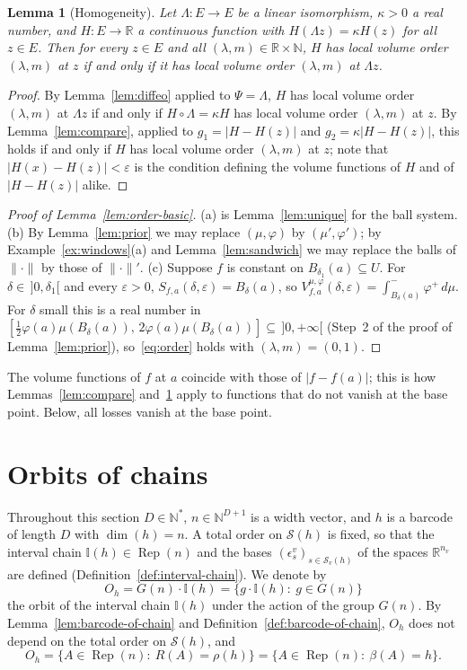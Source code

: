 \documentclass[11pt,a4paper]{article}
\newtheorem{lemma}[theorem]{Lemma}
\theoremstyle{definition}
\theoremstyle{remark}
\numberwithin{equation}{section}
\newcommand{\N}{\mathbb{N}}
\newcommand{\R}{\mathbb{R}}
\newcommand{\Rep}{\operatorname{Rep}}
\newcommand{\norm}[1]{\lVert #1\rVert}
\newcommand{\abs}[1]{\lvert #1\rvert}
\newcommand{\eps}{\varepsilon}
\newcommand{\I}{\mathbb I}
\newcommand{\Sl}{\mathcal S}
\begin{document}
\begin{lemma}[Homogeneity]\label{lem:homog-order}
Let $\Lambda:E\to E$ be a linear isomorphism, $\kappa>0$ a real number, and $H:E\to\R$ a continuous function with $H(\Lambda z)=\kappa H(z)$ for all $z\in E$. Then for every $z\in E$ and all $(\lambda,m)\in\R\times\N$, $H$ has local volume order $(\lambda,m)$ at $z$ if and only if it has local volume order $(\lambda,m)$ at $\Lambda z$.
\end{lemma}
\begin{proof}
By Lemma~\ref{lem:diffeo} applied to $\Psi=\Lambda$, $H$ has local volume order $(\lambda,m)$ at $\Lambda z$ if and only if $H\circ\Lambda=\kappa H$ has local volume order $(\lambda,m)$ at $z$. By Lemma~\ref{lem:compare}, applied to $g_1=\abs{H-H(z)}$ and $g_2=\kappa\abs{H-H(z)}$, this holds if and only if $H$ has local volume order $(\lambda,m)$ at $z$; note that $\abs{H(x)-H(z)}<\eps$ is the condition defining the volume functions of $H$ and of $\abs{H-H(z)}$ alike.
\end{proof}

\begin{proof}[Proof of Lemma~\ref{lem:order-basic}]
(a) is Lemma~\ref{lem:unique} for the ball system. (b) By Lemma~\ref{lem:prior} we may replace $(\mu,\varphi)$ by $(\mu',\varphi')$; by Example~\ref{ex:windows}(a) and Lemma~\ref{lem:sandwich} we may replace the balls of $\norm\cdot$ by those of $\norm\cdot'$. (c) Suppose $f$ is constant on $B_{\delta_1}(a)\subseteq U$. For $\delta\in\,]0,\delta_1[$ and every $\eps>0$, $S_{f,a}(\delta,\eps)=B_\delta(a)$, so $V^{\mu,\varphi}_{f,a}(\delta,\eps)=\int^-_{B_\delta(a)}\varphi^+\,d\mu$. For $\delta$ small this is a real number in $[\frac{1}{2}\varphi(a)\mu(B_\delta(a)),\,2\varphi(a)\mu(B_\delta(a))]\subseteq\,]0,+\infty[$ (Step~2 of the proof of Lemma~\ref{lem:prior}), so~\eqref{eq:order} holds with $(\lambda,m)=(0,1)$.
\end{proof}

The volume functions of $f$ at $a$ coincide with those of $\abs{f-f(a)}$; this is how Lemmas~\ref{lem:compare} and~\ref{lem:homog-order} apply to functions that do not vanish at the base point. Below, all losses vanish at the base point.
\section{Orbits of chains}\label{sec:quiver}

Throughout this section $D\in\N^*$, $n\in\N^{D+1}$ is a width vector, and $h$ is a barcode of length $D$ with $\dim(h)=n$. A total order on $\Sl(h)$ is fixed, so that the interval chain $\I(h)\in\Rep(n)$ and the bases $(\epsilon^v_s)_{s\in\Sl_v(h)}$ of the spaces $\R^{n_v}$ are defined (Definition~\ref{def:interval-chain}). We denote by
\[
O_h=G(n)\cdot\I(h)=\{g\cdot\I(h):\ g\in G(n)\}
\]
the orbit of the interval chain $\I(h)$ under the action of the group $G(n)$. By Lemma~\ref{lem:barcode-of-chain} and Definition~\ref{def:barcode-of-chain}, $O_h$ does not depend on the total order on $\Sl(h)$, and
\begin{equation}\label{eq:orbit-ranks}
O_h=\{A\in\Rep(n):\ R(A)=\rho(h)\}=\{A\in\Rep(n):\ \beta(A)=h\}.
\end{equation}
\end{document}

